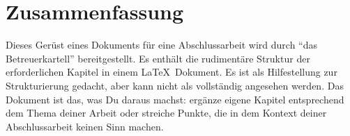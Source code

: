 \chapter*{Zusammenfassung}
\label{ch:zusammenfassung}

Dieses Ger\"ust eines Dokuments f\"ur eine Abschlussarbeit wird durch "`das
Betreuerkartell"' bereitgestellt. Es enth\"alt die rudiment\"are Struktur der
erforderlichen Kapitel in einem \LaTeX~Dokument. Es ist als Hilfestellung zur
Strukturierung gedacht, aber kann nicht als vollst\"andig angesehen werden.
Das Dokument ist das, was Du daraus machst: erg\"anze eigene Kapitel entsprechend
dem Thema deiner Arbeit oder streiche Punkte, die in dem Kontext deiner
Abschlussarbeit keinen Sinn machen.

